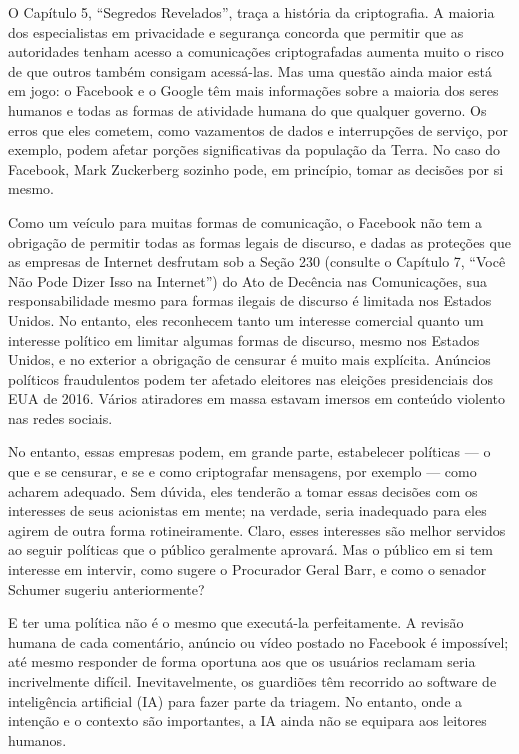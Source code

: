 O Capítulo 5, ``Segredos Revelados'', traça a história da criptografia. A maioria dos especialistas
em privacidade e segurança concorda que permitir que as autoridades tenham acesso a comunicações
criptografadas aumenta muito o risco de que outros também consigam acessá-las. Mas uma questão
ainda maior está em jogo: o Facebook e o Google têm mais informações sobre a maioria dos seres
humanos e todas as formas de atividade humana do que qualquer governo. Os erros que eles cometem,
como vazamentos de dados e interrupções de serviço, por exemplo, podem afetar porções significativas
da população da Terra. No caso do Facebook, Mark Zuckerberg sozinho pode, em princípio, tomar as
decisões por si mesmo.

Como um veículo para muitas formas de comunicação, o Facebook não tem a obrigação de permitir todas
as formas legais de discurso, e dadas as proteções que as empresas de Internet desfrutam sob a
Seção 230 (consulte o Capítulo 7, ``Você Não Pode Dizer Isso na Internet'') do Ato de Decência nas
Comunicações, sua responsabilidade mesmo para formas ilegais de discurso é limitada nos Estados
Unidos. No entanto, eles reconhecem tanto um interesse comercial quanto um interesse político em
limitar algumas formas de discurso, mesmo nos Estados Unidos, e no exterior a obrigação de censurar
é muito mais explícita. Anúncios políticos fraudulentos podem ter afetado eleitores nas eleições
presidenciais dos EUA de 2016. Vários atiradores em massa estavam imersos em conteúdo violento nas
redes sociais.

No entanto, essas empresas podem, em grande parte, estabelecer políticas --- o que e se censurar, e
se e como criptografar mensagens, por exemplo --- como acharem adequado. Sem dúvida, eles tenderão
a tomar essas decisões com os interesses de seus acionistas em mente; na verdade, seria inadequado
para eles agirem de outra forma rotineiramente. Claro, esses interesses são melhor servidos ao
seguir políticas que o público geralmente aprovará. Mas o público em si tem interesse em intervir,
como sugere o Procurador Geral Barr, e como o senador Schumer sugeriu anteriormente?

E ter uma política não é o mesmo que executá-la perfeitamente. A revisão humana de cada comentário,
anúncio ou vídeo postado no Facebook é impossível; até mesmo responder de forma oportuna aos que os
usuários reclamam seria incrivelmente difícil. Inevitavelmente, os guardiões têm recorrido ao
software de inteligência artificial (IA) para fazer parte da triagem. No entanto, onde a intenção
e o contexto são importantes, a IA ainda não se equipara aos leitores humanos.

